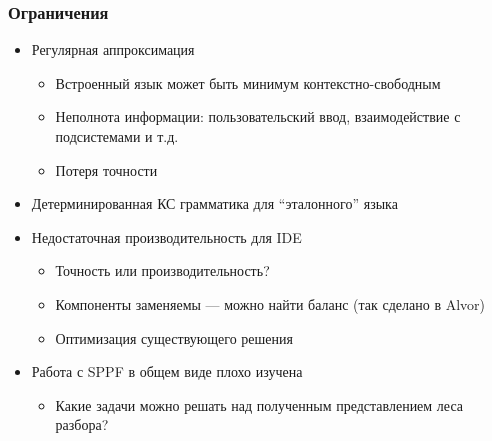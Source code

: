 \documentclass{beamer}
\begin{document}
\begin{frame}[t]
    \transwipe[direction=90]
    \frametitle{Ограничения}
    \begin{itemize}
        \item Регулярная аппроксимация
        \begin{itemize}
          \item Встроенный язык может быть минимум контекстно-свободным
          \item Неполнота информации: пользовательский ввод, взаимодействие с подсистемами и т.д.
          \item Потеря точности
        \end{itemize}
        \item Детерминированная КС грамматика для ``эталонного'' языка 
        \item Недостаточная производительность для IDE
        \begin{itemize}
          \item Точность или производительность?
          \item Компоненты заменяемы --- можно найти баланс (так сделано в Alvor)
          \item Оптимизация существующего решения
        \end{itemize}
        \item Работа с SPPF в общем виде плохо изучена
        \begin{itemize}
          \item Какие задачи можно решать над полученным представлением леса разбора?
        \end{itemize}
    \end{itemize}
\end{frame}
\end{document}
